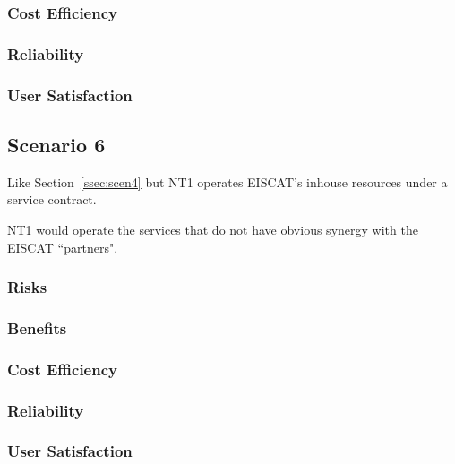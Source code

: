 \documentclass[12pt,a4paper]{article}
\begin{document}
\subsubsection*{Cost Efficiency}
\bitm
\item 
\eitm

\subsubsection*{Reliability}
\bitm
\item 
\eitm

\subsubsection*{User Satisfaction}
\bitm
\item 
\eitm

\subsection{Scenario 6}
\label{ssec:scen6}

Like Section~\ref{ssec:scen4} but NT1 operates EISCAT's inhouse resources under a service contract.

NT1 would operate the services that do not have obvious synergy with the EISCAT ``partners".

\subsubsection*{Risks}
\bitm
\item 
\eitm

\subsubsection*{Benefits}
\bitm
\item 
\eitm

\subsubsection*{Cost Efficiency}
\bitm
\item 
\eitm

\subsubsection*{Reliability}
\bitm
\item 
\eitm

\subsubsection*{User Satisfaction}
\bitm
\item 
\eitm
\newpage
{}

\end{document}
